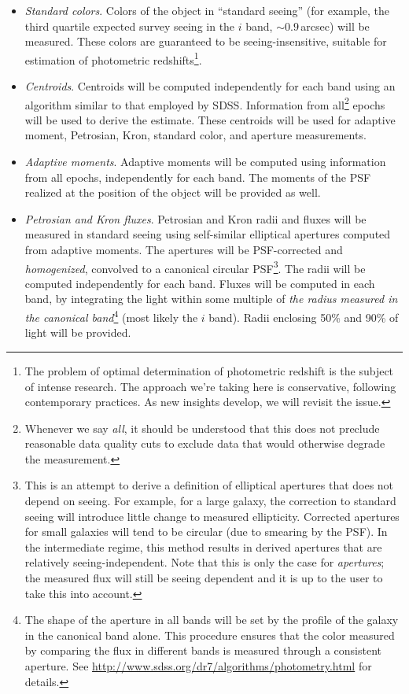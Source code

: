 \documentclass[12pt]{article}
\newcommand{\req}[1]{\marginpar{\tiny #1}}
\newcommand{\dmreq}[1]{\req{DMS-REQ-#1}}
\begin{document}
\begin{itemize}
    \item \emph{Standard colors}. \dmreq{0276} Colors of the object in ``standard seeing'' (for example, the third quartile expected survey seeing in the $i$ band, $\sim 0.9$\,arcsec) will be measured. These colors are guaranteed to be seeing-insensitive,  suitable for estimation of photometric redshifts\footnote{The problem of optimal determination of photometric redshift is the subject of intense research. The approach we're taking here is conservative, following contemporary practices. As new insights develop, we will revisit the issue.}.

    \item \emph{Centroids}. Centroids will be computed independently for each band using an algorithm similar to that employed by SDSS. Information from all\footnote{Whenever we say \emph{all}, it should be understood that this does not preclude reasonable data quality cuts to exclude data that would otherwise degrade the measurement.} epochs will be used to derive the estimate. These centroids will be used for adaptive moment, Petrosian, Kron, standard color, and aperture measurements. \dmreq{0276}

    \item \emph{Adaptive moments}. Adaptive moments will be computed using information from all epochs, independently for each band. The moments of the PSF realized at the position of the object will be provided as well. \dmreq{0276}

    \item \emph{Petrosian and Kron fluxes}. Petrosian and Kron radii and fluxes will be measured in standard seeing using self-similar elliptical apertures computed from adaptive moments. The apertures will be PSF-corrected and \emph{homogenized}, convolved to a canonical circular PSF\footnote{This is an attempt to derive a definition of elliptical apertures that does not depend on seeing. For example, for a large galaxy, the correction to standard seeing will introduce little change to measured ellipticity. Corrected apertures for small galaxies will tend to be circular (due to smearing by the PSF). In the intermediate regime, this method results in derived apertures that are relatively seeing-independent. Note that this is only the case for \emph{apertures}; the measured flux will still be seeing dependent and it is up to the user to take this into account.}. The radii will be computed independently for each band. Fluxes will be computed in each band, by integrating the light within some multiple of \emph{the radius measured in the canonical band}\footnote{The shape of the aperture in all bands will be set by the profile of the galaxy in the canonical band alone. This procedure ensures that the color measured by comparing the flux in different bands is measured through a consistent aperture. See \url{http://www.sdss.org/dr7/algorithms/photometry.html} for details.} (most likely the $i$ band). Radii enclosing 50\% and 90\% of light will be provided. \dmreq{0276}


\end{itemize}
\end{document}

